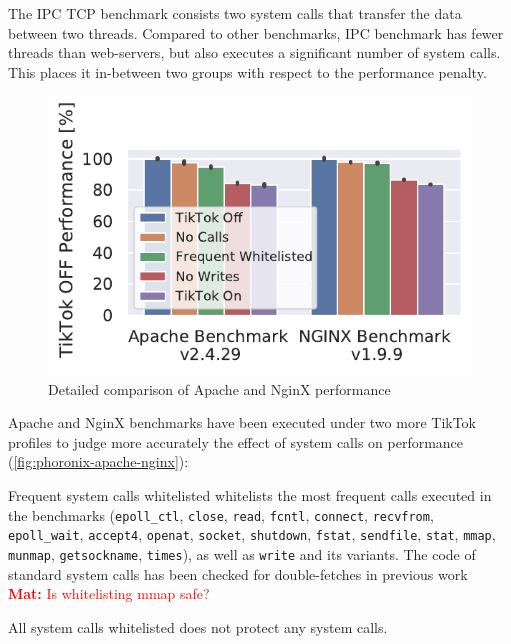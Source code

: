 \documentclass[conference]{IEEEtran}
\newcommand{\mat}[1]{\textcolor{red}{\textbf{Mat:} #1}}
\newcommand{\sysname}{TikTok}
\begin{document}
The IPC TCP benchmark consists two system calls that transfer the data between
two threads. Compared to other benchmarks, IPC benchmark has fewer threads than
web-servers, but also executes a significant number of system calls. This places
it in-between two groups with respect to the performance penalty.

\begin{figure}[]
  \centering
  \includegraphics[width=\linewidth]{img/freq_removed.pdf}
  \caption{Detailed comparison of Apache and NginX performance}
  \label{fig:phoronix-apache-nginx}
\end{figure}

Apache and NginX benchmarks have been executed under two more \sysname{}
profiles to judge more accurately the effect of system calls on performance
(\autoref{fig:phoronix-apache-nginx}):

\begin{LaTeXdescription}
  \item[Frequent system calls whitelisted] whitelists the most frequent calls
  executed in the benchmarks (\texttt{epoll\_ctl}, \texttt{close},
  \texttt{read}, \texttt{fcntl}, \texttt{connect}, \texttt{recvfrom},
  \texttt{epoll\_wait}, \texttt{accept4}, \texttt{openat}, \texttt{socket},
  \texttt{shutdown}, \texttt{fstat}, \texttt{sendfile}, \texttt{stat},
  \texttt{mmap}, \texttt{munmap}, \texttt{getsockname}, \texttt{times}), as well
  as \texttt{write} and its variants. The code of standard system calls has been
  checked for double-fetches in previous work~\cite{wang2017double,
  xu2018precise}
\mat{Is whitelisting mmap safe?}

  \item[All system calls whitelisted] does not protect any system calls.
\end{LaTeXdescription}
\end{document}
